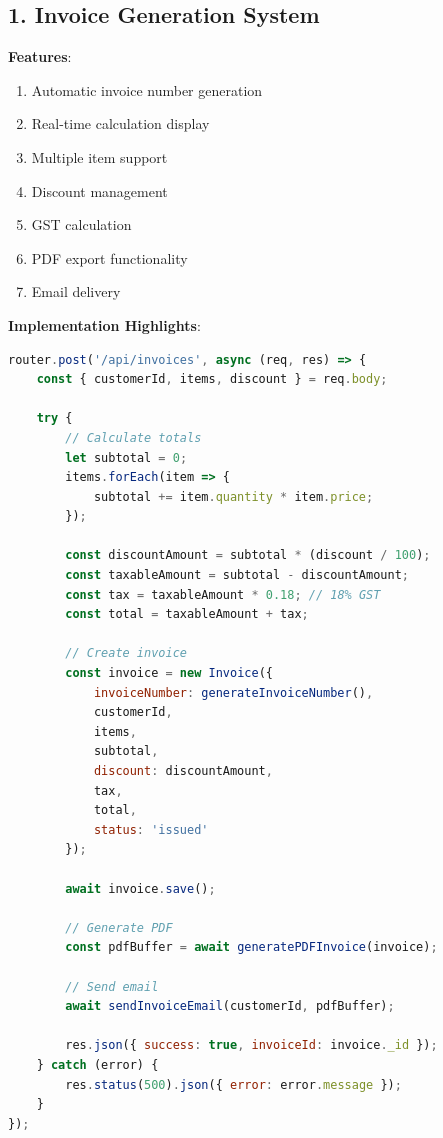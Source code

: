 \documentclass[12pt,a4paper]{report}
\begin{document}
\subsection{1. Invoice Generation System}

\textbf{Features}:
\begin{enumerate}[label=\roman*)]
    \item Automatic invoice number generation
    \item Real-time calculation display
    \item Multiple item support
    \item Discount management
    \item GST calculation
    \item PDF export functionality
    \item Email delivery
\end{enumerate}

\textbf{Implementation Highlights}:

\begin{lstlisting}[language=JavaScript, caption=Invoice Generation API]
router.post('/api/invoices', async (req, res) => {
    const { customerId, items, discount } = req.body;
    
    try {
        // Calculate totals
        let subtotal = 0;
        items.forEach(item => {
            subtotal += item.quantity * item.price;
        });
        
        const discountAmount = subtotal * (discount / 100);
        const taxableAmount = subtotal - discountAmount;
        const tax = taxableAmount * 0.18; // 18% GST
        const total = taxableAmount + tax;
        
        // Create invoice
        const invoice = new Invoice({
            invoiceNumber: generateInvoiceNumber(),
            customerId,
            items,
            subtotal,
            discount: discountAmount,
            tax,
            total,
            status: 'issued'
        });
        
        await invoice.save();
        
        // Generate PDF
        const pdfBuffer = await generatePDFInvoice(invoice);
        
        // Send email
        await sendInvoiceEmail(customerId, pdfBuffer);
        
        res.json({ success: true, invoiceId: invoice._id });
    } catch (error) {
        res.status(500).json({ error: error.message });
    }
});
\end{lstlisting}
\end{document}
